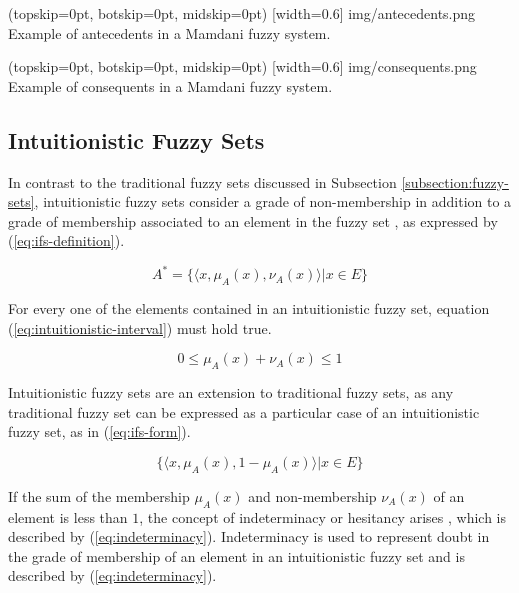 \documentclass{ieeeaccess}
\begin{document}
\Figure[](topskip=0pt, botskip=0pt, midskip=0pt)
[width=0.6\linewidth]
{img/antecedents.png}
{Example of antecedents in a Mamdani fuzzy system.
  \label{figure:antecedents}}

\Figure[](topskip=0pt, botskip=0pt, midskip=0pt)
[width=0.6\linewidth]
{img/consequents.png}
{Example of consequents in a Mamdani fuzzy system.
  \label{figure:consequents}}

\subsection{Intuitionistic Fuzzy Sets}
\label{subsection:intuitionistic-fuzzy-sets}

In contrast to the traditional fuzzy sets discussed in Subsection
\ref{subsection:fuzzy-sets}, intuitionistic fuzzy sets consider a grade of
non-membership in addition to a grade of membership associated to an element in
the fuzzy set \cite{Atanassov1986}, as expressed by (\ref{eq:ifs-definition}).

\begin{equation}
  \label{eq:ifs-definition}
  A^{*} = \{\langle x, \mu _{A} (x), \nu _{A} (x) \rangle | x \in E\}
\end{equation}

For every one of the elements contained in an intuitionistic fuzzy set, 
equation (\ref{eq:intuitionistic-interval}) must hold true.

\begin{equation}
  \label{eq:intuitionistic-interval}
  0 \leq \mu_{A}(x) + \nu_{A}(x) \leq 1
\end{equation}

Intuitionistic fuzzy sets are an extension to traditional fuzzy sets, as any
traditional fuzzy set can be expressed as a particular case of an intuitionistic
fuzzy set, as in (\ref{eq:ifs-form}).

\begin{equation}
  \label{eq:ifs-form}
  \{ \langle x, \mu_{A}(x), 1 - \mu_{A}(x) \rangle | x \in E \}
\end{equation}

If the sum of the membership $\mu_{A}(x)$ and non-membership $\nu_{A}(x)$ of an
element is less than $1$, the concept of indeterminacy or hesitancy arises \cite{Atanassov1986},
which is described by (\ref{eq:indeterminacy}). Indeterminacy is used to represent
doubt in the grade of membership of an element in an intuitionistic fuzzy set
and is described by (\ref{eq:indeterminacy}).
\end{document}

